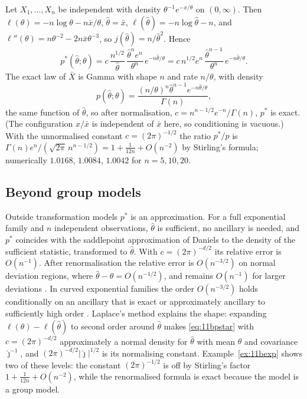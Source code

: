 \begin{example}\label{ex:11bexp}
Let $X_1,\dots,X_n$ be independent with density $\theta^{-1}e^{-x/\theta}$ on $(0,\infty)$. Then $\ell(\theta)=-n\log\theta-n\bar x/\theta$, $\hat\theta=\bar x$, $\ell(\hat\theta)=-n\log\hat\theta-n$, and $\ell''(\theta)=n\theta^{-2}-2n\bar x\theta^{-3}$, so $j(\hat\theta)=n/\hat\theta^2$. Hence
\[
p^*(\hat\theta;\theta)=c\,\frac{n^{1/2}}{\hat\theta}\,\frac{\hat\theta^n e^n}{\theta^n}\,e^{-n\hat\theta/\theta}=c\,n^{1/2}e^n\,\frac{\hat\theta^{n-1}}{\theta^n}\,e^{-n\hat\theta/\theta}.
\]
The exact law of $\bar X$ is Gamma with shape $n$ and rate $n/\theta$, with density
\[p(\hat\theta;\theta)=\frac{(n/\theta)^n\hat\theta^{n-1}e^{-n\hat\theta/\theta}}{\Gamma(n)},\]
the same function of $\hat\theta$, so after normalisation, $c=n^{n-1/2}e^{-n}/\Gamma(n)$, $p^*$ is exact. (The configuration $x/\bar x$ is independent of $\bar x$ here, so conditioning is vacuous.) With the unnormalised constant $c=(2\pi)^{-1/2}$ the ratio $p^*/p$ is $\Gamma(n)e^n/(\sqrt{2\pi}\,n^{n-1/2})=1+\frac1{12n}+O(n^{-2})$ by Stirling's formula; numerically $1.0168$, $1.0084$, $1.0042$ for $n=5,10,20$.
\end{example}

\subsection{Beyond group models}

Outside transformation models $p^*$ is an approximation. For a full exponential family and $n$ independent observations, $\hat\theta$ is sufficient, no ancillary is needed, and $p^*$ coincides with the saddlepoint approximation of Daniels \cite{daniels1954} to the density of the sufficient statistic, transformed to $\hat\theta$. With $c=(2\pi)^{-d/2}$ its relative error is $O(n^{-1})$. After renormalisation the relative error is $O(n^{-3/2})$ on normal deviation regions, where $\hat\theta-\theta=O(n^{-1/2})$, and remains $O(n^{-1})$ for larger deviations \cite{barndorffnielsen1983,barndorffnielsencox1994,reid1988}. In curved exponential families the order $O(n^{-3/2})$ holds conditionally on an ancillary that is exact or approximately ancillary to sufficiently high order \cite{barndorffnielsen1980,barndorffnielsencox1994}. Laplace's method explains the shape: expanding $\ell(\theta)-\ell(\hat\theta)$ to second order around $\hat\theta$ makes \eqref{eq:11bpstar} with $c=(2\pi)^{-d/2}$ approximately a normal density for $\hat\theta$ with mean $\theta$ and covariance $\hat\jmath^{-1}$, and $(2\pi)^{-d/2}|\hat\jmath|^{1/2}$ is its normalising constant. Example~\ref{ex:11bexp} shows two of these levels: the constant $(2\pi)^{-1/2}$ is off by Stirling's factor $1+\frac1{12n}+O(n^{-2})$, while the renormalised formula is exact because the model is a group model.

